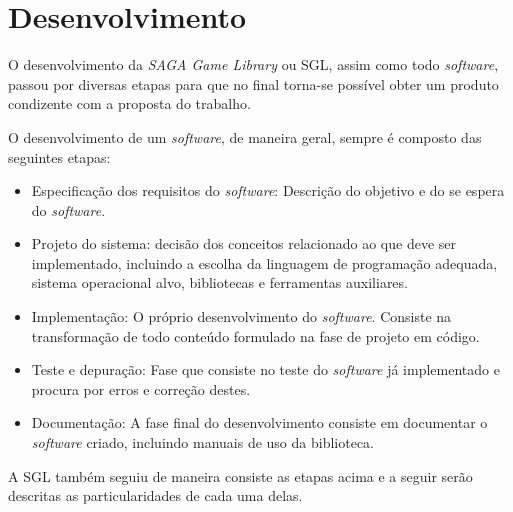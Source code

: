 \chapter{Desenvolvimento}
\label{cap:desenvolvimento}
%
%
O desenvolvimento da \textit{SAGA Game Library} ou SGL, assim como todo \textit{software}, passou por diversas etapas para que no final torna-se possível obter um produto condizente com a proposta do trabalho.
\par 
O desenvolvimento de um \textit{software}, de maneira geral, sempre é composto das seguintes etapas:
%
\begin{itemize}
 \item Especificação dos requisitos do \textit{software}: Descrição do objetivo e do se espera do \textit{software}.
 \item Projeto do sistema: decisão dos conceitos relacionado ao que deve ser implementado, incluindo a escolha da linguagem de programação
 adequada, sistema operacional alvo, bibliotecas e ferramentas auxiliares.
 \item Implementação: O próprio desenvolvimento do \textit{software}. Consiste na transformação de todo conteúdo formulado na fase de projeto em código.
 \item Teste e depuração: Fase que consiste no teste do \textit{software} já implementado e procura por erros e correção destes.
 \item Documentação: A fase final do desenvolvimento consiste em documentar o \textit{software} criado, incluindo manuais de uso da biblioteca.
\end{itemize}
%
\par 
A SGL também seguiu de maneira consiste as etapas acima e a seguir serão descritas as particularidades de cada uma delas.
%
%